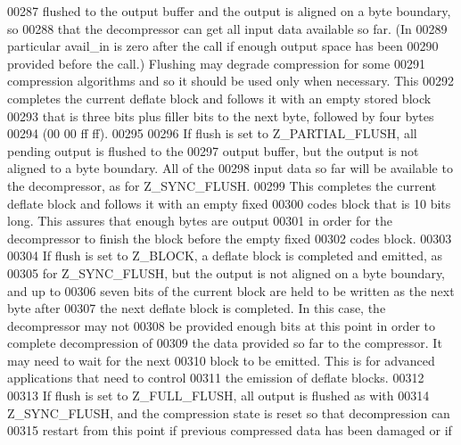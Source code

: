 \begin{DoxyCode}
00287 \textcolor{comment}{  flushed to the output buffer and the output is aligned on a byte boundary, so}
00288 \textcolor{comment}{  that the decompressor can get all input data available so far.  (In}
00289 \textcolor{comment}{  particular avail\_in is zero after the call if enough output space has been}
00290 \textcolor{comment}{  provided before the call.) Flushing may degrade compression for some}
00291 \textcolor{comment}{  compression algorithms and so it should be used only when necessary.  This}
00292 \textcolor{comment}{  completes the current deflate block and follows it with an empty stored block}
00293 \textcolor{comment}{  that is three bits plus filler bits to the next byte, followed by four bytes}
00294 \textcolor{comment}{  (00 00 ff ff).}
00295 \textcolor{comment}{}
00296 \textcolor{comment}{    If flush is set to Z\_PARTIAL\_FLUSH, all pending output is flushed to the}
00297 \textcolor{comment}{  output buffer, but the output is not aligned to a byte boundary.  All of the}
00298 \textcolor{comment}{  input data so far will be available to the decompressor, as for Z\_SYNC\_FLUSH.}
00299 \textcolor{comment}{  This completes the current deflate block and follows it with an empty fixed}
00300 \textcolor{comment}{  codes block that is 10 bits long.  This assures that enough bytes are output}
00301 \textcolor{comment}{  in order for the decompressor to finish the block before the empty fixed}
00302 \textcolor{comment}{  codes block.}
00303 \textcolor{comment}{}
00304 \textcolor{comment}{    If flush is set to Z\_BLOCK, a deflate block is completed and emitted, as}
00305 \textcolor{comment}{  for Z\_SYNC\_FLUSH, but the output is not aligned on a byte boundary, and up to}
00306 \textcolor{comment}{  seven bits of the current block are held to be written as the next byte after}
00307 \textcolor{comment}{  the next deflate block is completed.  In this case, the decompressor may not}
00308 \textcolor{comment}{  be provided enough bits at this point in order to complete decompression of}
00309 \textcolor{comment}{  the data provided so far to the compressor.  It may need to wait for the next}
00310 \textcolor{comment}{  block to be emitted.  This is for advanced applications that need to control}
00311 \textcolor{comment}{  the emission of deflate blocks.}
00312 \textcolor{comment}{}
00313 \textcolor{comment}{    If flush is set to Z\_FULL\_FLUSH, all output is flushed as with}
00314 \textcolor{comment}{  Z\_SYNC\_FLUSH, and the compression state is reset so that decompression can}
00315 \textcolor{comment}{  restart from this point if previous compressed data has been damaged or if}

\end{DoxyCode}
